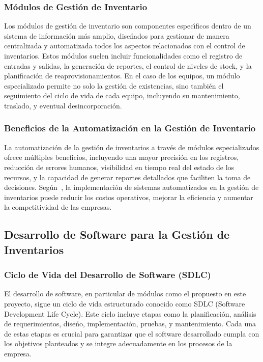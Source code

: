 \documentclass[stu, 12pt, letterpaper, donotrepeattitle, floatsintext, natbib]{apa7}
\begin{document}
\subsubsection{M\'odulos de Gesti\'on de Inventario}
Los m\'odulos de gesti\'on de inventario son componentes espec\'{\i}ficos dentro de un sistema de informaci\'on m\'as amplio, dise\'{n}ados para gestionar de manera centralizada y automatizada todos los aspectos relacionados con el control de
inventarios. Estos m\'odulos suelen incluir funcionalidades como el registro de entradas y salidas, la generaci\'on de reportes, el control de niveles de stock, y la planificaci\'on de reaprovisionamientos. En el caso de los equipos,
un m\'odulo especializado permite no solo la gesti\'on de existencias, sino tambi\'en el seguimiento del ciclo de vida de cada equipo, incluyendo su mantenimiento, traslado, y eventual desincorporaci\'on.
\subsubsection{Beneficios de la Automatizaci\'on en la Gesti\'on de Inventario}
La automatizaci\'on de la gesti\'on de inventarios a trav\'es de m\'odulos especializados ofrece m\'ultiples beneficios, incluyendo una mayor precisi\'on en los registros, reducci\'on de errores humanos, visibilidad en tiempo real del estado
de los recursos, y la capacidad de generar reportes detallados que faciliten la toma de decisiones. Seg\'un~\cite{ll}, la implementaci\'on de sistemas automatizados en la gesti\'on de inventarios puede reducir los costos
operativos, mejorar la eficiencia y aumentar la competitividad de las empresas.
\subsection{Desarrollo de Software para la Gesti\'on de Inventarios}
\subsubsection{Ciclo de Vida del Desarrollo de Software (SDLC)}
El desarrollo de software, en particular de m\'odulos como el propuesto en este proyecto, sigue un ciclo de vida estructurado conocido como SDLC (Software Development Life Cycle). Este ciclo incluye etapas como la planificaci\'on,
an\'alisis de requerimientos, dise\'{n}o, implementaci\'on, pruebas, y mantenimiento. Cada una de estas etapas es crucial para garantizar que el software desarrollado cumpla con los objetivos planteados y se integre adecuadamente en
los procesos de la empresa.
\end{document}
